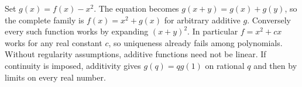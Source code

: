 Set $g(x)=f(x)-x^2$. The equation becomes $g(x+y)=g(x)+g(y)$, so the complete family is $\boxed{f(x)=x^2+g(x)}$ for arbitrary additive $g$. Conversely every such function works by expanding $(x+y)^2$. In particular $f=x^2+cx$ works for any real constant $c$, so uniqueness already fails among polynomials. Without regularity assumptions, additive functions need not be linear. If continuity is imposed, additivity gives $g(q)=qg(1)$ on rational $q$ and then by limits on every real number.

